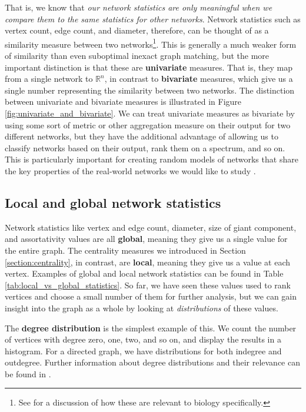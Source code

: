 \documentclass[12pt]{thesis}
\theoremstyle{plain}
\theoremstyle{definition}
\theoremstyle{remark}
\newcommand{\R}{\mathbb{R}}
\begin{document}
That is, we know that \textit{our network statistics are only meaningful when we compare them to the same statistics for other networks}. 
Network statistics such as vertex count, edge count, and diameter, therefore, can be thought of as a similarity measure between two networks\footnote{See \cite{Aittokallio_2006} for a discussion of how these are relevant to biology specifically.}. This is generally a much weaker form of similarity than even suboptimal inexact graph matching, but the more important distinction is that these are \textbf{univariate} measures. That is, they map from a single network to $\R^n$, in contrast to \textbf{bivariate} measures, which give us a single number representing the similarity between two networks. The distinction between univariate and bivariate measures is illustrated in Figure \ref{fig:univariate_and_bivariate}. We can treat univariate measures as bivariate by using some sort of metric or other aggregation measure on their output for two different networks, but they have the additional advantage of allowing us to classify networks based on their output, rank them on a spectrum, and so on. This is particularly important for creating random models of networks that share the key properties of the real-world networks we would like to study \cite{Hayes_2013, Watts_1998}.

\subsection{Local and global network statistics}

Network statistics like vertex and edge count, diameter, size of giant component, and assortativity values are all \textbf{global}, meaning they give us a single value for the entire graph. The centrality measures we introduced in Section \ref{section:centrality}, in contrast, are \textbf{local}, meaning they give us a value at each vertex. Examples of global and local network statistics can be found in Table \ref{tab:local_vs_global_statistics}. So far, we have seen these values used to rank vertices and choose a small number of them for further analysis, but we can gain insight into the graph as a whole by looking at \textit{distributions} of these values.

The \textbf{degree distribution} is the simplest example of this. We count the number of vertices with degree zero, one, two, and so on, and display the results in a histogram. For a directed graph, we have distributions for both indegree and outdegree. Further information about degree distributions and their relevance can be found in \cite{newman2010}.
\end{document}
